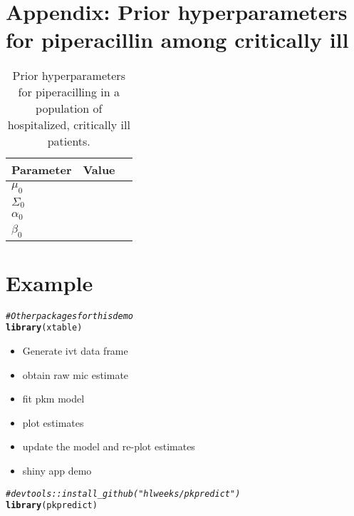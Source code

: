 \documentclass{article}\usepackage[]{graphicx}\usepackage[]{color}
\makeatletter
\newcommand{\hlcom}[1]{\textcolor[rgb]{0.678,0.584,0.686}{\textit{#1}}}%
\newcommand{\hlstd}[1]{\textcolor[rgb]{0.345,0.345,0.345}{#1}}%
\newcommand{\hlkwd}[1]{\textcolor[rgb]{0.737,0.353,0.396}{\textbf{#1}}}%
\newenvironment{kframe}{%
 \def\at@end@of@kframe{}%
 \ifinner\ifhmode%
  \def\at@end@of@kframe{\end{minipage}}%
  \begin{minipage}{\columnwidth}%
 \fi\fi%
 \def\FrameCommand##1{\hskip\@totalleftmargin \hskip-\fboxsep
 \colorbox{shadecolor}{##1}\hskip-\fboxsep
     \hskip-\linewidth \hskip-\@totalleftmargin \hskip\columnwidth}%
 \MakeFramed {\advance\hsize-\width
   \@totalleftmargin\z@ \linewidth\hsize
   \@setminipage}}%
 {\par\unskip\endMakeFramed%
 \at@end@of@kframe}
\newenvironment{knitrout}{}{} %
\makeatother
\begin{document}
\section{Appendix: Prior hyperparameters for piperacillin among critically ill}
\begin{center}
\begin{table}
\begin{tabular}{lll} \hline
Parameter & Value \\ \hline
$\mu_0$ & \\
$\Sigma_0$ & \\
$\alpha_0$ & \\
$\beta_0$  & \\
\hline
\end{tabular}
\caption{Prior hyperparameters for piperacilling in a population of hospitalized, critically ill patients.}\label{tab:hyp}
\end{table}
\end{center}


\section{Example}
\begin{knitrout}
\color{fgcolor}\begin{kframe}
\begin{alltt}
\hlcom{#Other packages for this demo}
\hlkwd{library}\hlstd{(xtable)}
\end{alltt}
\end{kframe}
\end{knitrout}


\begin{itemize}
  \item Generate ivt data frame
  \item obtain raw mic estimate
  \item fit pkm model
  \item plot estimates
  \item update the model and re-plot estimates
  \item shiny app demo
\end{itemize}

\begin{knitrout}
\color{fgcolor}\begin{kframe}
\begin{alltt}
\hlcom{#  devtools::install_github("hlweeks/pkpredict")}
\hlkwd{library}\hlstd{(pkpredict)}
\end{alltt}


{\ttfamily\noindent\itshape\color{messagecolor}{\#\# Loading required package: mvtnorm}}\end{kframe}
\end{knitrout}
\end{document}
